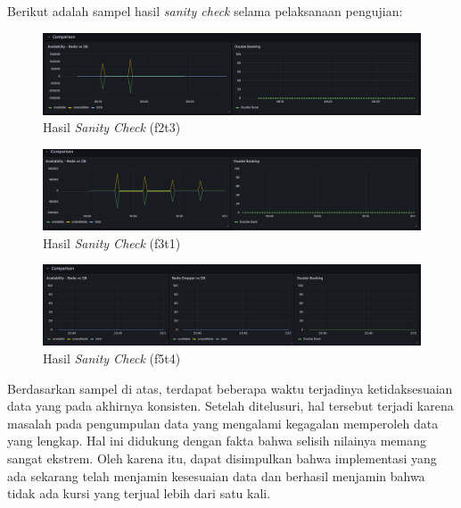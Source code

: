 Berikut adalah sampel hasil \textit{sanity check} selama pelaksanaan pengujian:

\begin{figure}[htbp]
    \centering
    \includegraphics[width=1\textwidth]{resources/chapter-4/sanity-f2t3.png}
    \caption{Hasil \textit{Sanity Check} (f2t3)}
    \label{fig:sanity-f2t3}
\end{figure}

\begin{figure}[htbp]
    \centering
    \includegraphics[width=1\textwidth]{resources/chapter-4/sanity-f3t1.png}
    \caption{Hasil \textit{Sanity Check} (f3t1)}
    \label{fig:sanity-f3t1}
\end{figure}

\begin{figure}[htbp]
    \centering
    \includegraphics[width=1\textwidth]{resources/chapter-4/sanity-f5t4.png}
    \caption{Hasil \textit{Sanity Check} (f5t4)}
    \label{fig:sanity-f5t4}
\end{figure}

Berdasarkan sampel di atas, terdapat beberapa waktu terjadinya ketidaksesuaian data yang pada akhirnya konsisten. Setelah ditelusuri, hal tersebut terjadi karena masalah pada pengumpulan data yang mengalami kegagalan memperoleh data yang lengkap. Hal ini didukung dengan fakta bahwa selisih nilainya memang sangat ekstrem. Oleh karena itu, dapat disimpulkan bahwa implementasi yang ada sekarang telah menjamin kesesuaian data dan berhasil menjamin bahwa tidak ada kursi yang terjual lebih dari satu kali.
